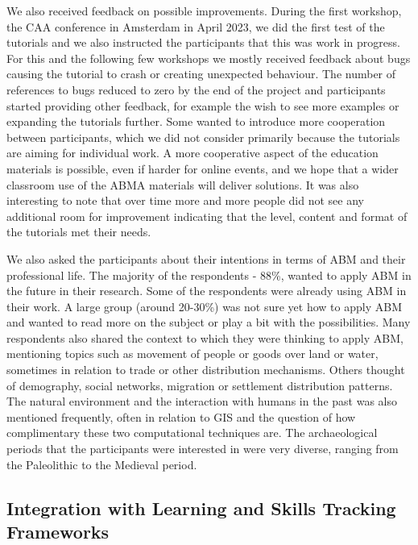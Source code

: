 \documentclass[
]{article}
\begin{document}
We also received feedback on possible improvements. During the first workshop, the CAA conference in Amsterdam in April 2023, we did the first test of the tutorials and we also instructed the participants that this was work in progress. For this and the following few workshops we mostly received feedback about bugs causing the tutorial to crash or creating unexpected behaviour. The number of references to bugs reduced to zero by the end of the project and participants started providing other feedback, for example the wish to see more examples or expanding the tutorials further. Some wanted to introduce more cooperation between participants, which we did not consider primarily because the tutorials are aiming for individual work. A more cooperative aspect of the education materials is possible, even if harder for online events, and we hope that a wider classroom use of the ABMA materials will deliver solutions. It was also interesting to note that over time more and more people did not see any additional room for improvement indicating that the level, content and format of the tutorials met their needs.

We also asked the participants about their intentions in terms of ABM and their professional life. The majority of the respondents - 88\%, wanted to apply ABM in the future in their research. Some of the respondents were already using ABM in their work. A large group (around 20-30\%) was not sure yet how to apply ABM and wanted to read more on the subject or play a bit with the possibilities. Many respondents also shared the context to which they were thinking to apply ABM, mentioning topics such as movement of people or goods over land or water, sometimes in relation to trade or other distribution mechanisms. Others thought of demography, social networks, migration or settlement distribution patterns. The natural environment and the interaction with humans in the past was also mentioned frequently, often in relation to GIS and the question of how complimentary these two computational techniques are. The archaeological periods that the participants were interested in were very diverse, ranging from the Paleolithic to the Medieval period.

\hypertarget{integration-with-learning-and-skills-tracking-frameworks}{%
\subsection{Integration with Learning and Skills Tracking Frameworks}\label{integration-with-learning-and-skills-tracking-frameworks}}
\end{document}
